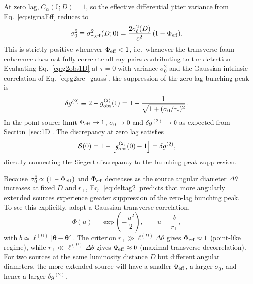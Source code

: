 \documentclass[aps,prd,onecolumn,amsmath,amssymb]{revtex4-2}
\begin{document}
At zero lag, $C_\alpha(0;D) = 1$, so the effective differential jitter variance
from Eq.~\eqref{eq:sigmaEff} reduces to
\begin{equation}
  \sigma_0^2
  \equiv \sigma_{\tau,\rm eff}^2(D;0)
  = \frac{2\sigma_\ell^2(D)}{c^2}\,(1 - \Phi_{\rm eff}).
  \label{eq:sigma0}
\end{equation}
This is strictly positive whenever $\Phi_{\rm eff} < 1$, i.e.\ whenever the
transverse foam coherence does not fully correlate all ray pairs contributing
to the detection.
Evaluating Eq.~\eqref{eq:g2obs1D} at $\tau = 0$ with variance $\sigma_0^2$
and the Gaussian intrinsic correlation of Eq.~\eqref{eq:g2src_gauss}, the
suppression of the zero-lag bunching peak is
\begin{equation}
  \delta g^{(2)}
  \equiv 2 - g^{(2)}_{\rm obs}(0)
  = 1 - \frac{1}{\sqrt{1 + (\sigma_0/\tau_c)^2}}.
  \label{eq:deltag2}
\end{equation}
In the point-source limit $\Phi_{\rm eff} \to 1$, $\sigma_0 \to 0$ and
$\delta g^{(2)} \to 0$ as expected from Section~\ref{sec:1D}.
The discrepancy at zero lag satisfies
\begin{equation}
  \mathcal{S}(0) = 1 - \left[g^{(2)}_{\rm obs}(0) - 1\right] = \delta g^{(2)},
  \label{eq:S0}
\end{equation}
directly connecting the Siegert discrepancy to the bunching peak suppression.

Because $\sigma_0^2 \propto (1 - \Phi_{\rm eff})$ and $\Phi_{\rm eff}$
decreases as the source angular diameter $\Delta\theta$ increases at fixed $D$
and $r_\perp$, Eq.~\eqref{eq:deltag2} predicts that more angularly extended
sources experience greater suppression of the zero-lag bunching peak.
To see this explicitly, adopt a Gaussian transverse correlation,
\begin{equation}
  \Phi(u) = \exp\!\left(-\frac{u^2}{2}\right),
  \qquad u = \frac{b}{r_\perp},
  \label{eq:PhiGauss}
\end{equation}
with $b \simeq \ell^{(D)}|\boldsymbol{\theta} - \boldsymbol{\theta}'|$.
The criterion $r_\perp \gg \ell^{(D)}\Delta\theta$ gives $\Phi_{\rm eff}
\approx 1$ (point-like regime), while $r_\perp \ll \ell^{(D)}\Delta\theta$
gives $\Phi_{\rm eff} \approx 0$ (maximal transverse decorrelation).
For two sources at the same luminosity distance $D$ but different angular
diameters, the more extended source will have a smaller $\Phi_{\rm eff}$,
a larger $\sigma_0$, and hence a larger $\delta g^{(2)}$.
\end{document}
